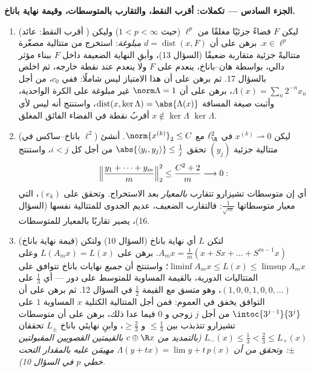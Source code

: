 \begin{problem}[{مسألة نهاية الأسبوع --- $(\ell^p)' = \ell^q$، والانعكاسية،
وغرابة $\ell^\infty$}]
\medskip
\noindent\textbf{الجزء السادس --- تكملات: أقرب النقط، والتقارب
بالمتوسطات، وقيمة نهاية باناخ.}
\begin{enumerate}[resume]
  \item (أقرب النقط: عائد ) ليكن $F$ فضاءً جزئيًا
        مغلقًا من $\ell^p$ (حيث $1 < p < \infty$) وليكن
        $x \in \ell^p$. برهن على أن $d = \operatorname{dist}(x,
        F)$ \emph{مبلوغة}:
        استخرج من متتالية مصغّرة متتاليةً جزئية متقاربة ضعيفًا
        (السؤال 13)، وأبقِ النهاية الضعيفة داخل $F$ ببناء مؤثر
        دالي، بواسطة هان--باناخ، ينعدم على $F$ ولا ينعدم عند
        نقطة خارجه، ثم اخلص بالسؤال 17. ثم برهن على أن هذا
        الامتياز ليس شاملًا: ففي $c_0$، من أجل $\Lambda(x) = \sum_n2^{-n}x_n$، برهن
        على أن $\norm\Lambda = 1$ غير مبلوغة على الكرة الواحدية، وأثبت
        صيغة المسافة $\operatorname{dist}(x, \ker\Lambda) =
        \abs{\Lambda(x)}$، واستنتج أنه ليس لأي $x \notin
        \ker\Lambda$ أقربُ
        نقطة في الفضاء الفائق المغلق $\ker\Lambda$.
  \item (باناخ--ساكس في $\ell^2$) ليكن $x^{(k)}
        \rightharpoonup 0$ في $\ell^2_{\R}$
        مع $\norm{x^{(k)}}_2 \leq C$. أنشئ متتالية جزئية $(y_j)$ تحقق $\abs{\langle y_i, y_j\rangle} \leq
        \frac1j$ من
        أجل كل $i < j$، واستنتج
        \[
        \Bigl\lVert\frac{y_1 + \dots + y_m}m\Bigr\rVert_2^2
        \leq \frac{C^2 + 2}m \longrightarrow 0 :
        \]
        أي إن متوسطات تشيزارو تتقارب \emph{بالمعيار} بعد
        الاستخراج. وتحقق على $(e_k)$، التي معيار متوسطاتها
        $\frac1{\sqrt m}$: فالتقارب الضعيف، عديم الجدوى للمتتالية نفسها
        (السؤال 16)، يصير تقاربًا بالمعيار للمتوسطات.
  \item (قيمة نهاية باناخ) لتكن $L$ أي نهاية باناخ (السؤال 10)
        ولتكن $A_mx = \frac1m(x + Sx + \dots
        + S^{m-1}x)$. برهن على $L(A_mx) = L(x)$ وعلى $\liminf A_mx
        \leq L(x) \leq \limsup A_mx$؛
        واستنتج أن \emph{جميع} نهايات باناخ تتوافق على
        المتتاليات الدورية، بالقيمة المساوية للمتوسط على دور ---
        أي $\frac13$ على $(1, 0, 0, 1,
        0, 0, \dots)$، وهو متسق مع القيمة $\frac12$
        في السؤال 12. ثم برهن على أن التوافق يخفق في العموم:
        فمن أجل المتتالية الكتلية $x$ المساوية $1$ على $\intoc{3^{j-1}}{3^j}$
        من أجل $j$ زوجي و $0$ فيما عدا ذلك، برهن على أن متوسطات
        تشيزارو تتذبذب بين $\leq
        \frac13$ و $\geq \frac23$، وابنِ
        نهايتَي باناخ $L_\pm$ تحققان $L_-(x) \leq \frac13 < \frac23
        \leq L_+(x)$ \emph{(بالتمديد من
        $c \oplus \R x$ بالقيمتين القصويين المقبولتين $\pm$:
        وتحقق من أن $\Lambda(y + tx) = \lim y + t\,p(x)$ مهيمَن عليه بالمقدار التحت خطي $p$
        في السؤال 10)}.
\end{enumerate}
\end{problem}
